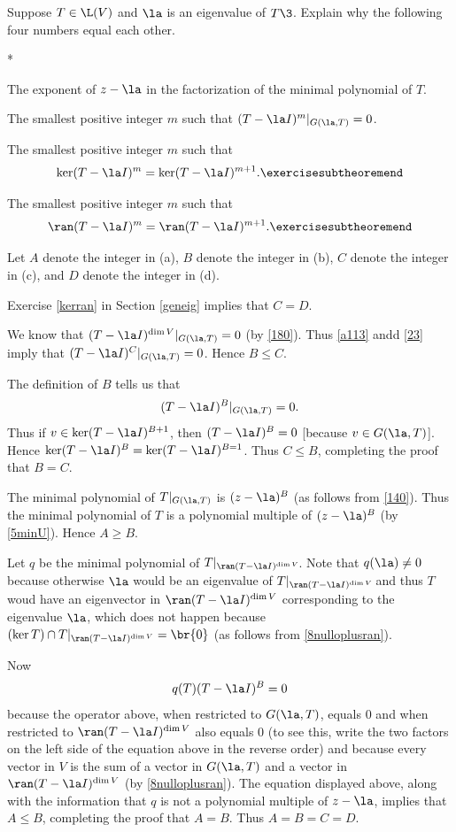 \exercise
Suppose $T \in \L(V)$ and $\la$ is an eigenvalue of $T\3$. Explain why the following four numbers equal each other.
\begin{subtheorem}*
\item
The exponent of $z-\la$ in the factorization of the minimal polynomial of $T$.
\item
The smallest positive integer $m$ such that $(T - \la I)^m|_{G(\la, T)} = 0$.
\item
The smallest positive integer $m$ such that
\[
\ker (T - \la I)^m = \ker (T - \la I)^{m+1}.
\exercisesubtheoremend
\]
\item
The smallest positive integer $m$ such that
\[
\ran (T - \la I)^m = \ran (T - \la I)^{m+1}.
\exercisesubtheoremend
\]
\end{subtheorem}

\begin{Solution}
Let $A$ denote the integer in (a), $B$ denote the integer in (b), $C$ denote the integer in (c), and $D$ denote the integer in (d).

Exercise \ref{kerran} in Section \ref{geneig} implies that $C = D$.

We know that $(T - \la I)^{\dim V}|_{G(\la, T)} = 0$ (by \ref{180}). Thus \ref{a113} andd \ref{23} imply that $(T - \la I)^C|_{G(\la, T)} = 0$. Hence $B \le C$.

The definition of $B$ tells us that
\[
(T - \la I)^B|_{G(\la, T)} = 0.
\]
Thus if $v \in \ker (T - \la I)^{B+1}$, then $(T - \la I)^B = 0$ [because
$v \in G(\la, T)$]. Hence $\ker(T - \la I)^B = \ker(T - \la I)^{B=1}$. Thus $C \le B$, completing the proof that $B = C$.

The minimal polynomial of $T|_{G(\la, T)}$ is $(z - \la)^B$ (as follows from \ref{140}). Thus the minimal polynomial of $T$ is a polynomial multiple of $(z-\la)^B$ (by \ref{5minU}). Hence $A \ge B$.

Let $q$ be the minimal polynomial of $T|_{\ran(T-\la I)^{\dim V}}\!$. Note that $q(\la) \ne 0$ because otherwise $\la$ would be an eigenvalue of $T|_{\ran(T-\la I)^{\dim V}}\!$ and thus $T$ woud have an eigenvector in
$\ran(T-\la I)^{\dim V}$ corresponding to the eigenvalue $\la$, which does not happen because
$(\ker T) \cap T|_{\ran(T-\la I)^{\dim V}} = \br{0}$ (as follows from \ref{8nulloplusran}).

Now
\[
q(T) (T - \la I)^B = 0
\]
because the operator above, when restricted to $G(\la, T)$, equals $0$ and when restricted to $\ran(T-\la I)^{\dim V}$ also equals $0$ (to see this, write the two factors on the left side of the equation above in the reverse order) and because every vector in $V$ is the sum of a vector in $G(\la, T)$ and a vector in $\ran(T-\la I)^{\dim V}$ (by \ref{8nulloplusran}). The equation displayed above, along with the information that $q$ is not a polynomial multiple of $z-\la$, implies that $A \le B$, completing the proof that $A = B$. Thus
$A = B = C = D$.
\end{Solution}

